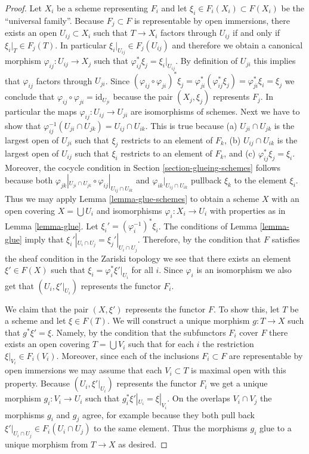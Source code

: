 \begin{proof}
Let $X_i$ be a scheme representing $F_i$ and let
$\xi_i \in F_i(X_i) \subset F(X_i)$ be the ``universal family''.
Because $F_j \subset F$ is representable by open immersions,
there exists an open $U_{ij} \subset X_i$ such that
$T \to X_i$ factors through $U_{ij}$ if and only if
$\xi_i|_T \in F_j(T)$. In particular
$\xi_i|_{U_{ij}} \in F_j(U_{ij})$ and therefore we obtain a
canonical morphism $\varphi_{ij} : U_{ij} \to X_j$ such that
$\varphi_{ij}^*\xi_j = \xi_i|_{U_{ij}}$. By definition of $U_{ji}$
this implies that $\varphi_{ij}$ factors through $U_{ji}$.
Since $(\varphi_{ij} \circ \varphi_{ji})^*\xi_j
=\varphi_{ji}^*(\varphi_{ij}^*\xi_j) =
\varphi_{ji}^*\xi_i = \xi_j$ we conclude that
$\varphi_{ij} \circ \varphi_{ji} = \text{id}_{U_{ji}}$
because the pair $(X_j, \xi_j)$ represents $F_j$.
In particular the maps $\varphi_{ij} : U_{ij} \to U_{ji}$
are isomorphisms of schemes.
Next we have to show that
$\varphi_{ij}^{-1}(U_{ji} \cap U_{jk}) = U_{ij} \cap U_{ik}$.
This is true because (a) $U_{ji} \cap U_{jk}$ is the largest
open of $U_{ji}$ such that $\xi_j$ restricts to an element
of $F_k$, (b) $U_{ij} \cap U_{ik}$ is the largest
open of $U_{ij}$ such that $\xi_i$ restricts to an element
of $F_k$, and (c) $\varphi_{ij}^*\xi_j = \xi_i$. Moreover,
the cocycle condition in Section \ref{section-glueing-schemes}
follows because both
$\varphi_{jk}|_{U_{ji} \cap U_{jk}} \circ
\varphi_{ij}|_{U_{ij} \cap U_{ik}}$ and
$\varphi_{ik}|_{U_{ij} \cap U_{ik}}$ pullback $\xi_k$
to the element $\xi_i$.
Thus we may apply Lemma \ref{lemma-glue-schemes}
to obtain a scheme $X$ with an open
covering $X = \bigcup U_i$ and isomorphisms $\varphi_i : X_i \to U_i$
with properties as in Lemma \ref{lemma-glue}.
Let $\xi_i' = (\varphi_i^{-1})^* \xi_i$.
The conditions of Lemma \ref{lemma-glue} imply that
$\xi_i'|_{U_i \cap U_j} = \xi_j'|_{U_i \cap U_j}$.
Therefore, by the condition that $F$ satisfies the sheaf
condition in the Zariski topology we see that
there exists an element $\xi' \in F(X)$ such that
$\xi_i = \varphi_i^*\xi'|_{U_i}$ for all $i$.
Since $\varphi_i$ is an isomorphism we also get that
$(U_i, \xi'|_{U_i})$ represents the functor $F_i$.

\medskip\noindent
We claim that the pair $(X, \xi')$ represents the functor $F$.
To show this, let $T$ be a scheme and let $\xi \in F(T)$.
We will construct a unique morphism $g : T \to X$ such that
$g^*\xi' = \xi$. Namely, by the condition that the subfunctors
$F_i$ cover $F$ there exists an open covering $T = \bigcup V_i$
such that for each $i$ the restriction $\xi|_{V_i} \in F_i(V_i)$.
Moreover, since each of the inclusions $F_i \subset F$ are representable
by open immersions we may assume that each $V_i \subset T$ is maximal
open with this property.
Because $(U_i, \xi'|_{U_i})$ represents the functor $F_i$ we
get a unique morphism $g_i : V_i \to U_i$ such that
$g_i^*\xi'|_{U_i} = \xi|_{V_i}$. On the overlaps $V_i \cap V_j$
the morphisms $g_i$ and $g_j$ agree, for example because they both
pull back $\xi'|_{U_i \cap U_j} \in F_i(U_i \cap U_j)$
to the same element. Thus the morphisms $g_i$ glue to a unique morphism
from $T \to X$ as desired.
\end{proof}

